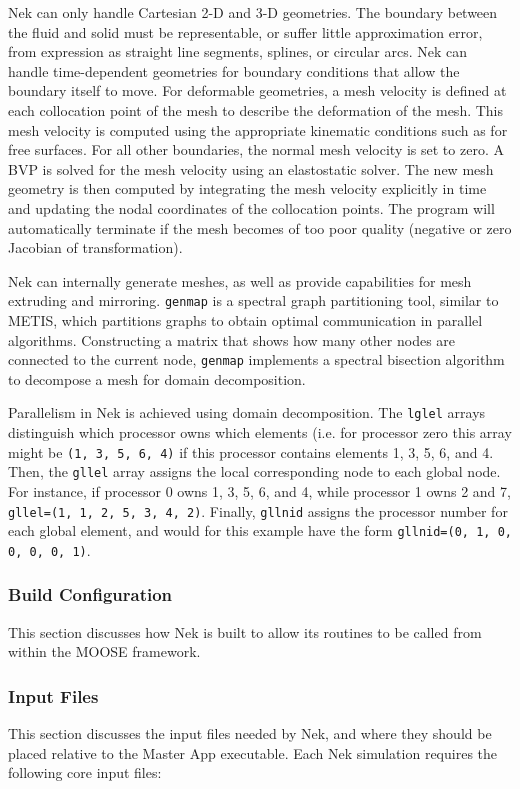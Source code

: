 \documentclass[10pt]{article}
\numberwithin{equation}{section} %
\begin{document}
Nek can only handle Cartesian 2-D and 3-D geometries. The boundary between the fluid and solid must be representable, or suffer little approximation error, from expression as straight line segments, splines, or circular arcs. Nek can handle time-dependent geometries for boundary conditions that allow the boundary itself to move. For deformable geometries, a mesh velocity is defined at each collocation point of the mesh to describe the deformation of the mesh. This mesh velocity is computed using the appropriate kinematic conditions such as for free surfaces. For all other boundaries, the normal mesh velocity is set to zero. A BVP is solved for the mesh velocity using an elastostatic solver. The new mesh geometry is then computed by integrating the mesh velocity explicitly in time and updating the nodal coordinates of the collocation points. The program will automatically terminate if the mesh becomes of too poor quality (negative or zero Jacobian of transformation). 

Nek can internally generate meshes, as well as provide capabilities for mesh extruding and mirroring. {\tt genmap} is a spectral graph partitioning tool, similar to METIS, which partitions graphs to obtain optimal communication in parallel algorithms. Constructing a matrix that shows how many other nodes are connected to the current node, {\tt genmap} implements a spectral bisection algorithm to decompose a mesh for domain decomposition.

Parallelism in Nek is achieved using domain decomposition. The {\tt lglel} arrays distinguish which processor owns which elements (i.e. for processor zero this array might be {\tt (1, 3, 5, 6, 4)} if this processor contains elements 1, 3, 5, 6, and 4. Then, the {\tt gllel} array assigns the local corresponding node to each global node. For instance, if processor 0 owns 1, 3, 5, 6, and 4, while processor 1 owns 2 and 7, {\tt gllel=(1, 1, 2, 5, 3, 4, 2)}. Finally, {\tt gllnid} assigns the processor number for each global element, and would for this example have the form {\tt gllnid=(0, 1, 0, 0, 0, 0, 1)}. 


\subsubsection{Build Configuration}
This section discusses how Nek is built to allow its routines to be called from within the MOOSE framework.

\subsubsection{Input Files}
This section discusses the input files needed by Nek, and where they should be placed relative to the Master App executable. Each Nek simulation requires the following core input files:
\end{document}
